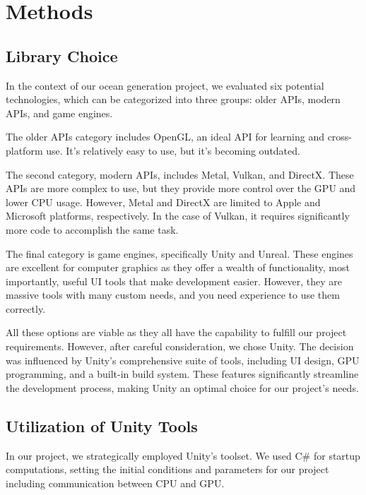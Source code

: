 \chapter{Methods}
\label{chapter2}
\justifying


\section{Library Choice}

In the context of our ocean generation project, we evaluated six potential technologies, which can be categorized into three groups: older APIs, modern APIs, and game engines.

The older APIs category includes OpenGL, an ideal API for learning and cross-platform use. It’s relatively easy to use, but it’s becoming outdated.

The second category, modern APIs, includes Metal, Vulkan, and DirectX. These APIs are more complex to use, but they provide more control over the GPU and lower CPU usage. However, Metal and DirectX are limited to Apple and Microsoft platforms, respectively. In the case of Vulkan, it requires significantly more code to accomplish the same task.

The final category is game engines, specifically Unity and Unreal. These engines are excellent for computer graphics as they offer a wealth of functionality, most importantly, useful UI tools that make development easier. However, they are massive tools with many custom needs, and you need experience to use them correctly.

All these options are viable as they all have the capability to fulfill our project requirements. However, after careful consideration, we chose Unity. The decision was influenced by Unity’s comprehensive suite of tools, including UI design, GPU programming, and a built-in build system. These features significantly streamline the development process, making Unity an optimal choice for our project’s needs.

\section{Utilization of Unity Tools}
In our project, we strategically employed Unity’s toolset. We used C\# for startup computations, setting the initial conditions and parameters for our project including communication between CPU and GPU.

